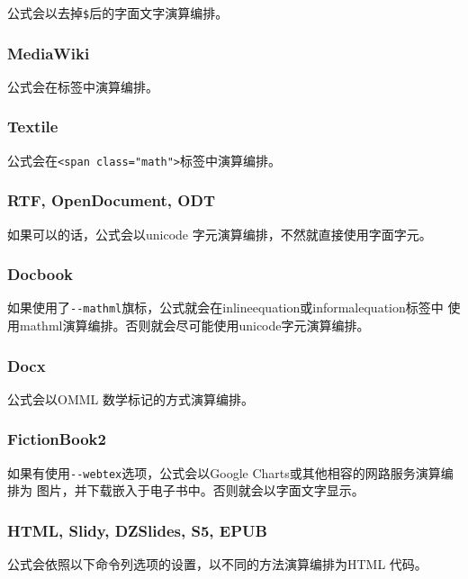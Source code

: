 \documentclass[fancyhdr,bookmark]{ctexbook}
\begin{document}
公式会以去掉\lstinline!$!后的字面文字演算编排。

\subsubsection{MediaWiki}\label{mediawiki}

公式会在标签中演算编排。

\subsubsection{Textile}\label{textile}

公式会在\lstinline!<span class="math">!标签中演算编排。

\subsubsection{RTF, OpenDocument, ODT}\label{rtf-opendocument-odt}

如果可以的话，公式会以unicode 字元演算编排，不然就直接使用字面字元。

\subsubsection{Docbook}\label{docbook}

如果使用了\lstinline!--mathml!旗标，公式就会在inlineequation或informalequation标签中
使用mathml演算编排。否则就会尽可能使用unicode字元演算编排。

\subsubsection{Docx}\label{docx}

公式会以OMML 数学标记的方式演算编排。

\subsubsection{FictionBook2}\label{fictionbook2}

如果有使用\lstinline!--webtex!选项，公式会以Google
Charts或其他相容的网路服务演算编排为
图片，并下载嵌入于电子书中。否则就会以字面文字显示。

\subsubsection{HTML, Slidy, DZSlides, S5,
EPUB}\label{html-slidy-dzslides-s5-epub}

公式会依照以下命令列选项的设置，以不同的方法演算编排为HTML 代码。
\end{document}
